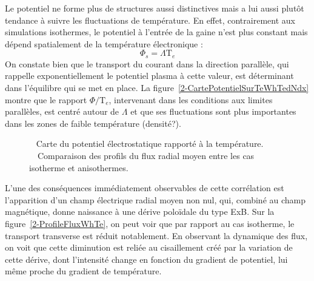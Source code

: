 \begin{refsection}
Le potentiel ne forme plus de structures aussi
distinctives mais a lui aussi
plutôt tendance à suivre les fluctuations de température. En effet,
contrairement aux simulations isothermes, le potentiel à l'entrée de la gaine
n'est plus constant mais dépend spatialement de la température électronique :
\begin{equation}
	\Phi_{s}=\Lambda\text{T}_e
\end{equation}
On constate bien que le transport du courant dans la direction parallèle, qui
rappelle exponentiellement le potentiel plasma à cette valeur, est déterminant
dans l'équilibre qui se met en place. La
figure~\ref{2-CartePotentielSurTeWhTedNdx} montre que le rapport
$\Phi/\text{T}_e$, intervenant dans les conditions aux limites parallèles, est
centré autour de $\Lambda$ et que ses fluctuations sont plus importantes dans
les zones de faible température (densité?).
\begin{figure}[!htbp]
\centering
    \caption{~ Carte du potentiel électrostatique
    rapporté à la température. ~~Comparaison des
    profils du flux radial moyen entre les cas isotherme et anisothermes.}
\end{figure}
L'une des conséquences immédiatement observables de cette corrélation est
l'apparition d'un champ électrique radial moyen non nul, qui, combiné au champ
magnétique, donne naissance à une dérive poloïdale du type ExB. Sur la
figure~\ref{2-ProfileFluxWhTe}, on peut voir que par rapport au cas isotherme,
le transport transverse est réduit notablement. En observant la dynamique
des flux, on voit que cette diminution est reliée au cisaillement créé par la
variation de cette dérive, dont l'intensité change en fonction du gradient de
potentiel, lui même proche du gradient de température.


\end{refsection}
